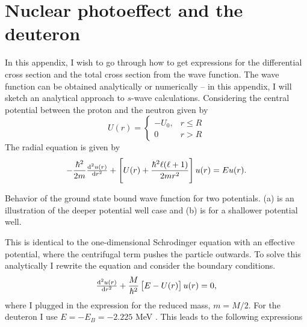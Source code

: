 \appendix

\chapter{Nuclear photoeffect and the deuteron}\label{app:deuteron}
In this appendix, I wish to go through how to get expressions for the differential cross section and the total cross section from the wave function. The wave function can be obtained analytically or numerically -- in this appendix, I will sketch an analytical approach to $s$-wave calculations. 
Considering the central potential between the proton and the neutron given by
  \[ U(r)= \begin{cases}
        -U_0, & r \leq R \\
        0 & r > R
     \end{cases}
  \]
  The radial equation is given by
  \begin{equation}
  	-\frac{\hbar^2}{2m} \od[2]{u(r)}{r}+\left[U(r)+\frac{\hbar^2 \ell(\ell+1)}{2mr^2} \right]u(r)=Eu(r).
  \end{equation}
\begin{marginfigure}
\centering

\caption{Behavior of the ground state bound wave function for two potentials. (a) is an illustration of the deeper potential well case and (b) is for a shallower potential well. }
\end{marginfigure}
  This is identical to the one-dimensional Schrodinger equation with an effective potential, where the centrifugal term pushes the particle outwards. To solve this analytically I rewrite the equation and consider the boundary conditions.
\begin{equation} \label{SEnew}
  \od[2]{u(r)}{r}+\frac{M}{\hbar^2} \left[E-U(r) \right]u(r)=0,
\end{equation}
where I plugged in the expression for the reduced mass, $m=M/2$. For the deuteron I use $E=-E_B = -2.225$ MeV \cite[p. 51]{KerneII}. This leads to the following expressions

